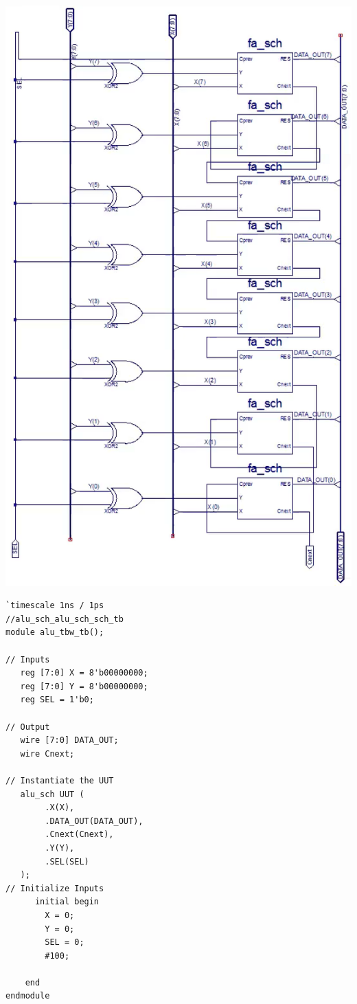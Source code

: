 \documentclass[12pt]{article}
\begin{document}
		\begin{center}
			\includegraphics[scale=.5]{alu_sch.png}
		\end{center}
		
		\begin{Verbatim}[frame=single, fontsize= \small]
`timescale 1ns / 1ps
//alu_sch_alu_sch_sch_tb
module alu_tbw_tb();

// Inputs
   reg [7:0] X = 8'b00000000;
   reg [7:0] Y = 8'b00000000;
   reg SEL = 1'b0;

// Output
   wire [7:0] DATA_OUT;
   wire Cnext;

// Instantiate the UUT
   alu_sch UUT (
		.X(X), 
		.DATA_OUT(DATA_OUT), 
		.Cnext(Cnext), 
		.Y(Y), 
		.SEL(SEL)
   );
// Initialize Inputs
      initial begin
		X = 0;
		Y = 0;
		SEL = 0;
		#100;

	end
endmodule
			
		\end{Verbatim}
\end{document}
